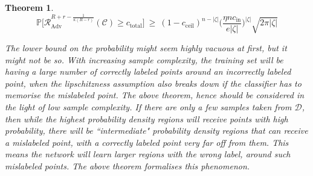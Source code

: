 \documentclass[12pt, oneside]{book}
\newtheorem{theorem}{Theorem}
\begin{document}
\begin{theorem}
    \begin{equation*}
        \mathbb{P} \biggl [
        \mathcal{R}_{\text{Adv}}^{R+r-\frac{1}{\kappa(R-r)}}
        (\mathcal{C}) \geq
        c_{\text{total}} 
        \biggr ]
        ~ \geq ~
        (1-c_{\text{ceil}})^{n-|\zeta|}
        \biggl (
            \frac{\eta n c_{\text{in}}}{e |\zeta|}
        \biggr )^{|\zeta|}
        \sqrt{2 \pi |\zeta|}
    \end{equation*}

    The lower bound on the probability might seem highly vacuous at first, but
    it might not be so. With increasing sample complexity, the training set will
    be having a large number of correctly labeled points around an incorrectly
    labeled point, when the lipschitzness assumption also breaks down if the
    classifier has to memorise the mislabeled point. The above theorem, hence
    should be considered in the light of low sample complexity. If there are
    only a few samples taken from $\mathcal{D}$, then while the highest
    probability density regions will receive points with high probability, there
    will be ``intermediate" probability density regions that can receive a
    mislabeled point, with a correctly labeled point very far off from them.
    This means the network will learn larger regions with the wrong label,
    around such mislabeled points. The above theorem formalises this phenomenon.
\end{theorem}
\end{document}
